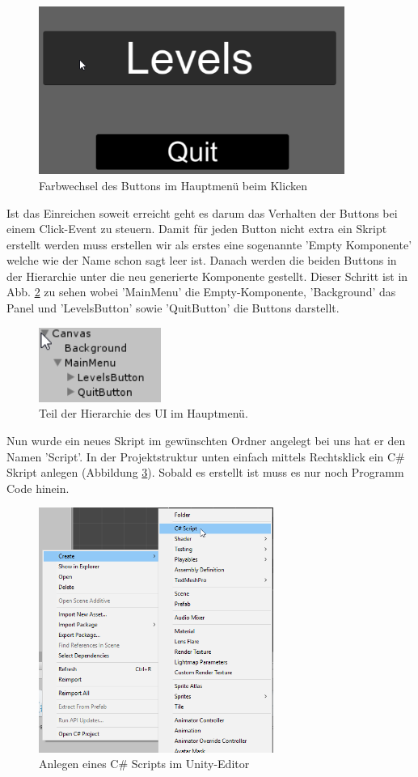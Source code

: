   \begin{figure}[H]
  	\centering
  	\includegraphics[width=10cm]{images/ButtonsClicked.png}
  	\caption{Farbwechsel des Buttons im Hauptmenü beim Klicken}
  	\label{ButtonClicked}
  \end{figure}

Ist das Einreichen soweit erreicht geht es darum das Verhalten der Buttons bei einem Click-Event zu steuern. Damit für jeden Button nicht extra ein Skript erstellt werden muss erstellen wir als erstes eine sogenannte 'Empty Komponente' welche wie der Name schon sagt leer ist. Danach werden die beiden Buttons in der Hierarchie unter die neu generierte Komponente gestellt. Dieser Schritt ist in Abb. \ref{MainMenuEmpty} zu sehen wobei 'MainMenu' die Empty-Komponente, 'Background' das Panel und 'LevelsButton' sowie 'QuitButton' die Buttons darstellt.

\begin{figure}[H]
	\includegraphics[width=4cm]{images/MainMenuEmpty.png}
	\caption{Teil der Hierarchie des UI im Hauptmenü.}
	\label{MainMenuEmpty}
\end{figure}
Nun wurde ein neues Skript im gewünschten Ordner angelegt bei uns hat er den Namen 'Script'. In der Projektstruktur unten einfach mittels Rechtsklick ein C\# Skript anlegen (Abbildung \ref{addScript}). Sobald es erstellt ist muss es nur noch Programm Code hinein.

\begin{figure}[H]
	\includegraphics[height=8cm]{images/addScript.png}
	\caption{Anlegen eines C\# Scripts im Unity-Editor}
	\label{addScript}
\end{figure}


